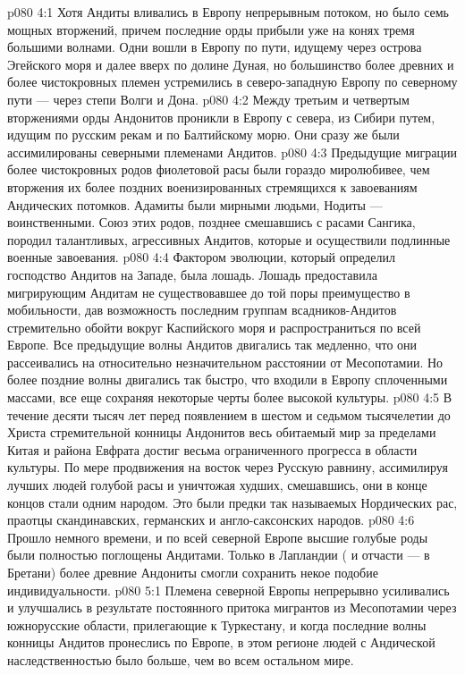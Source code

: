 \vs p080 4:1 Хотя Андиты вливались в Европу непрерывным потоком, но было семь мощных вторжений, причем последние орды прибыли уже на конях тремя большими волнами. Одни вошли в Европу по пути, идущему через острова Эгейского моря и далее вверх по долине Дуная, но большинство более древних и более чистокровных племен устремились в северо\hyp{}западную Европу по северному пути --- через степи Волги и Дона.
\vs p080 4:2 Между третьим и четвертым вторжениями орды Андонитов проникли в Европу с севера, из Сибири путем, идущим по русским рекам и по Балтийскому морю. Они сразу же были ассимилированы северными племенами Андитов.
\vs p080 4:3 Предыдущие миграции более чистокровных родов фиолетовой расы были гораздо миролюбивее, чем вторжения их более поздних военизированных стремящихся к завоеваниям Андических потомков. Адамиты были мирными людьми, Нодиты --- воинственными. Союз этих родов, позднее смешавшись с расами Сангика, породил талантливых, агрессивных Андитов, которые и осуществили подлинные военные завоевания.
\vs p080 4:4 \pc Фактором эволюции, который определил господство Андитов на Западе, была лошадь. Лошадь предоставила мигрирующим Андитам не существовавшее до той поры преимущество в мобильности, дав возможность последним группам всадников\hyp{}Андитов стремительно обойти вокруг Каспийского моря и распространиться по всей Европе. Все предыдущие волны Андитов двигались так медленно, что они рассеивались на относительно незначительном расстоянии от Месопотамии. Но более поздние волны двигались так быстро, что входили в Европу сплоченными массами, все еще сохраняя некоторые черты более высокой культуры.
\vs p080 4:5 В течение десяти тысяч лет перед появлением в шестом и седьмом тысячелетии до Христа стремительной конницы Андонитов весь обитаемый мир за пределами Китая и района Евфрата достиг весьма ограниченного прогресса в области культуры. По мере продвижения на восток через Русскую равнину, ассимилируя лучших людей голубой расы и уничтожая худших, смешавшись, они в конце концов стали одним народом. Это были предки так называемых Нордических рас, праотцы скандинавских, германских и англо\hyp{}саксонских народов.
\vs p080 4:6 \pc Прошло немного времени, и по всей северной Европе высшие голубые роды были полностью поглощены Андитами. Только в Лапландии ( и отчасти --- в Бретани) более древние Андониты смогли сохранить некое подобие индивидуальности.
\vs p080 5:1 Племена северной Европы непрерывно усиливались и улучшались в результате постоянного притока мигрантов из Месопотамии через южнорусские области, прилегающие к Туркестану, и когда последние волны конницы Андитов пронеслись по Европе, в этом регионе людей с Андической наследственностью было больше, чем во всем остальном мире.
